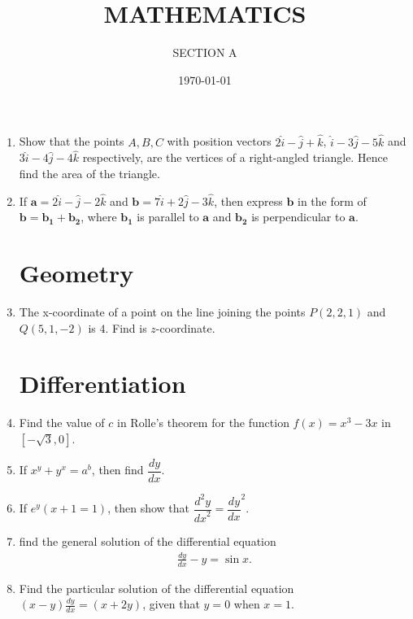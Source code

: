 \documentclass[10pt,-letter paper]{article}
\title{MATHEMATICS}
\author{SECTION A}
\date{\today}
\let\vec\mathbf{}
\let\vec\mathbf{}
\let\vec\mathbf{}
\providecommand{\brak}[1]{\ensuremath{\left(#1\right)}}
\providecommand{\sbrak}[1]{\ensuremath{\left[#1\right]}}
\begin{document}
\maketitle
\begin{enumerate}
\section{Vectors}
\item Show that the points $A, B, C$ with position vectors $2 \hat{i}-\hat{j}+\hat{k}$, $\hat{i}-3 \hat{j}-5\hat{k}$ and $3\hat{i}-4 \hat{j}-4 \hat{k}$ respectively, are the vertices of a right-angled triangle. Hence find the area of the triangle.
\item If $\vec{a} = 2\hat{i}-\hat{j}-2\hat{k}$ and $\vec{b} = 7\hat{i}+2\hat{j}-3\hat{k}$, then express $\vec{b}$ in the form of $\vec{b}=\vec{b_1}+\vec{b_2}$, where $\vec{b_1}$ is parallel to $\vec{a}$ and $\vec{b_2}$ is perpendicular to $\vec{a}$.
\section{Geometry}
\item The x-coordinate of a point on the line joining the points $P\brak{2, 2, 1}$ and $Q\brak{5, 1, -2}$ is $4$. Find is $z$-coordinate.
\section{Differentiation}
\item Find the value of $c$ in Rolle's theorem for the function $f\brak{x} = {x}^{3}-3x$ in $\sbrak {-\sqrt{3}, 0}$.
\item If ${x}^{y}+{y}^{x}={a}^{b}$, then find $\dfrac{dy}{dx}$.
\item If ${e}^{y}\brak{x+1=1}$, then show that $\dfrac{{d}^{2} y}{{dx}^{2}}=\dfrac{dy}{{dx}}^2$.
\item find the general solution of the differential equation
\begin{align*}
\frac{dy}{dx}-y=\sin x.
\end{align*}
\item Find the particular solution of the differential equation $\brak{x-y}\frac{dy}{dx} =\brak{x+2y}$, given that $y=0$ when $x=1$.

\end{enumerate}
\end{document}
